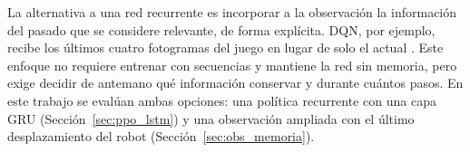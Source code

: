 La alternativa a una red recurrente es incorporar a la observación la información del pasado que se considere relevante, de forma explícita. DQN, por ejemplo, recibe los últimos cuatro fotogramas del juego en lugar de solo el actual \citep{hausknecht2015deep}. Este enfoque no requiere entrenar con secuencias y mantiene la red sin memoria, pero exige decidir de antemano qué información conservar y durante cuántos pasos. En este trabajo se evalúan ambas opciones: una política recurrente con una capa GRU (Sección~\ref{sec:ppo_lstm}) y una observación ampliada con el último desplazamiento del robot (Sección~\ref{sec:obs_memoria}).
